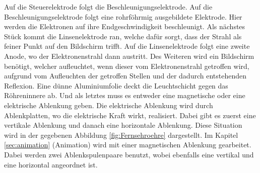 Auf die Steuerelektrode folgt die Beschleunigungselektrode.
Auf die Beschleunigungselektrode folgt eine rohrföhrmig ausgebildete Elektrode.
Hier werden die Elektronen auf ihre Endgeschwindigkeit beschleunigt.
Als nächstes Stück kommt die Linsenelektrode ran, welche dafür sorgt, dass der Strahl als feiner Punkt auf den Bildschirm trifft.
Auf die Linsenelektrode folgt eine zweite Anode, wo der Elektronenstrahl dann austritt.
Des Weiteren wird ein Bildschirm benötigt, welcher aufleuchtet, wenn dieser vom Elektronenstrahl getroffen wird, aufgrund vom Aufleuchten der getroffen Stellen und der dadurch entstehenden Reflexion.
Eine dünne Aluminiumfolie deckt die Leuchtschicht gegen das Röhreninnere ab.
Und als letztes muss es entweder eine magnetische oder eine elektrische Ablenkung geben.
Die elektrische Ablenkung wird durch Ablenkplatten, wo die elektrische Kraft wirkt, realisiert.
Dabei gibt es zuerst eine vertikale Ablenkung und danach eine horizontale Ablenkung.
Diese Situation wird in der gegebenen Abbildung \ref{fig:Fernsehroehre} dargestellt.
Im Kapitel \ref{sec:animation} (Animation) wird mit einer magnetischen Ablenkung gearbeitet.
Dabei werden zwei Ablenkspulenpaare benutzt, wobei ebenfalls eine vertikal und eine horizontal angeordnet ist.

